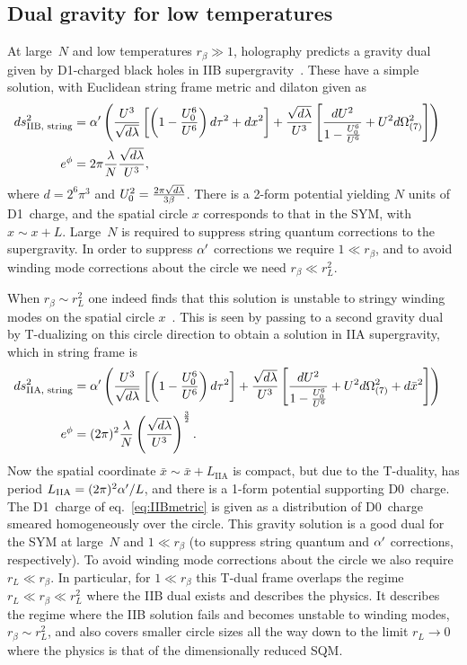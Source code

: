 \subsection{\label{sec:dualGrav}Dual gravity for low temperatures}
At large~$N$ and low temperatures $r_{\beta} \gg 1$, holography predicts a gravity dual given by D1-charged black holes in IIB supergravity~\cite{Itzhaki:1998dd}.
These have a simple solution, with Euclidean string frame metric and dilaton given as
\begin{align}
  \label{eq:IIBmetric}
  ds^2_{\text{IIB, string}} & = \alpha' \left(\frac{U^3}{\sqrt{d \lambda}}\left[\left(1 - \frac{U_0^6}{U^6} \right) d\tau^2 + dx^2\right] + \frac{\sqrt{d \lambda}}{U^3} \left[\frac{dU^2}{1 - \frac{U_0^6}{U^6}} + U^2 d\Omega^2_{(7)}\right]\right) \cr
  e^\phi & = 2\pi \frac{\lambda}{N} \frac{\sqrt{d \lambda}}{U^3},
\end{align}
where $d = 2^6 \pi^3$ and $U_0^2 = \frac{2 \pi \sqrt{d \lambda}}{3 \beta}$.
There is a 2-form potential yielding $N$ units of D1~charge, and the spatial circle $x$ corresponds to that in the SYM, with $x \sim x + L$.
Large~$N$ is required to suppress string quantum corrections to the supergravity.
In order to suppress $\alpha'$ corrections we require $1 \ll r_{\beta}$, and to avoid winding mode corrections about the circle we need $r_{\beta} \ll r_L^2$.

When $r_{\beta} \sim r_L^2$ one indeed finds that this solution is unstable to stringy winding modes on the spatial circle $x$~\cite{Susskind:1997dr, Barbon:1998cr, Li:1998jy, Martinec:1998ja, Aharony:2004ig, Aharony:2005ew}.
This is seen by passing to a second gravity dual by T-dualizing on this circle direction to obtain a solution in IIA supergravity, which in string frame is
\begin{align}
  \label{eq:IIAmetric}
  ds^2_{\text{IIA, string}} & = \alpha' \left(\frac{U^3}{\sqrt{d \lambda}}\left[\left(1 - \frac{U_0^6}{U^6}\right) d\tau^2\right] + \frac{\sqrt{d \lambda}}{U^3} \left[\frac{dU^2}{1 - \frac{U_0^6}{U^6}} + U^2 d\Omega^2_{(7)} + d\bar{x}^2\right]\right) \cr
  e^\phi & = (2\pi)^2 \frac{\lambda}{N} \left(\frac{\sqrt{d \lambda}}{U^3}\right)^{\frac{3}{2}}.
\end{align}
Now the spatial coordinate $\bar{x} \sim \bar{x} + L_{\text{IIA}}$ is compact, but due to the T-duality, has period $L_{\text{IIA}} = (2\pi)^2 \alpha' / L$, and there is a 1-form potential supporting D0~charge.
The D1~charge of eq.~\eqref{eq:IIBmetric} is given as a distribution of D0~charge smeared homogeneously over the circle.
This gravity solution is a good dual for the SYM at large~$N$ and $1 \ll r_{\beta}$ (to suppress string quantum and $\alpha'$ corrections, respectively).
To avoid winding mode corrections about the circle we also require $r_L \ll r_{\beta}$.
In particular, for $1 \ll r_{\beta}$ this T-dual frame overlaps the regime $r_L \ll r_{\beta} \ll r_L^2$ where the IIB dual exists and describes the physics.
It describes the regime where the IIB solution fails and becomes unstable to winding modes, $r_{\beta} \sim r_L^2$, and also covers smaller circle sizes all the way down to the limit $r_L \to 0$ where the physics is that of the dimensionally reduced SQM.

